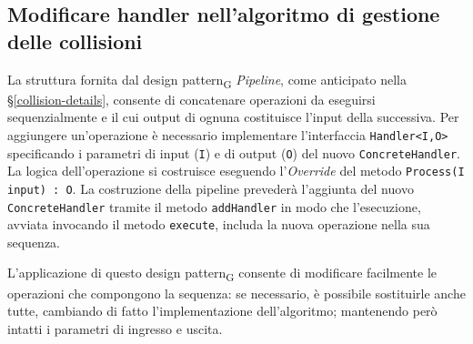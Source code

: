 \subsection{Modificare handler nell'algoritmo di gestione delle collisioni}

La struttura fornita dal design pattern\textsubscript{G} \textit{Pipeline}, come anticipato nella \S \ref{collision-details}, consente di concatenare operazioni da eseguirsi sequenzialmente e il cui output di ognuna costituisce l'input della successiva. Per aggiungere un'operazione è necessario implementare l'interfaccia \texttt{Handler<I,O>} specificando i parametri di input (\texttt{I}) e di output (\texttt{O}) del nuovo \texttt{ConcreteHandler}. La logica dell'operazione si costruisce eseguendo l'\textit{Override} del metodo \texttt{Process(I input) : O}. La costruzione della pipeline prevederà l'aggiunta del nuovo \texttt{ConcreteHandler} tramite il metodo \texttt{addHandler} in modo che l'esecuzione, avviata invocando il metodo \texttt{execute}, includa la nuova operazione nella sua sequenza.

L'applicazione di questo design pattern\textsubscript{G} consente di modificare facilmente le operazioni che compongono la sequenza: se necessario, è possibile sostituirle anche tutte, cambiando di fatto l'implementazione dell'algoritmo; mantenendo però intatti i parametri di ingresso e uscita.